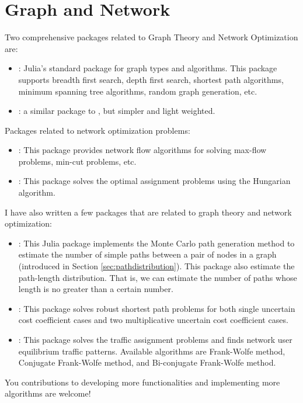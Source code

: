 \section{Graph and Network}

Two comprehensive packages related to Graph Theory and Network Optimization are:
\begin{itemize}
\item \href{https://github.com/JuliaLang/Graphs.jl}{}: Julia's standard package for graph types and algorithms. This package supports breadth first search, depth first search, shortest path algorithms, minimum spanning tree algorithms, random graph generation, etc.
\item \href{https://github.com/JuliaGraphs/LightGraphs.jl}{}: a similar package to , but simpler and light weighted.
\end{itemize}

Packages related to network optimization problems:
\begin{itemize}
\item \href{https://github.com/Azzaare/NetworkFlows.jl}{}: This package provides network flow algorithms for solving max-flow problems, min-cut problems, etc.
\item \href{https://github.com/FugroRoames/Munkres.jl}{}: This package solves the optimal assignment problems using the Hungarian algorithm.
\end{itemize}

I have also written a few packages that are related to graph theory and network optimization:
\begin{itemize}
\item \href{https://github.com/chkwon/PathDistribution.jl}{}: This Julia package implements the Monte Carlo path generation method to estimate the number of simple paths between a pair of nodes in a graph (introduced in Section \ref{sec:pathdistribution}). This package also estimate the path-length distribution. That is, we can estimate the number of paths whose length is no greater than a certain number.
\item \href{https://github.com/chkwon/RobustShortestPath.jl}{}: This package solves robust shortest path problems for both single uncertain cost coefficient cases and two multiplicative uncertain cost coefficient cases.
\item \href{https://github.com/chkwon/TrafficAssignment.jl}{}: This package solves the traffic assignment problems and finds network user equilibrium traffic patterns. Available algorithms are Frank-Wolfe method, Conjugate Frank-Wolfe method, and Bi-conjugate Frank-Wolfe method.
\end{itemize}
You contributions to developing more functionalities and implementing more algorithms are welcome!



